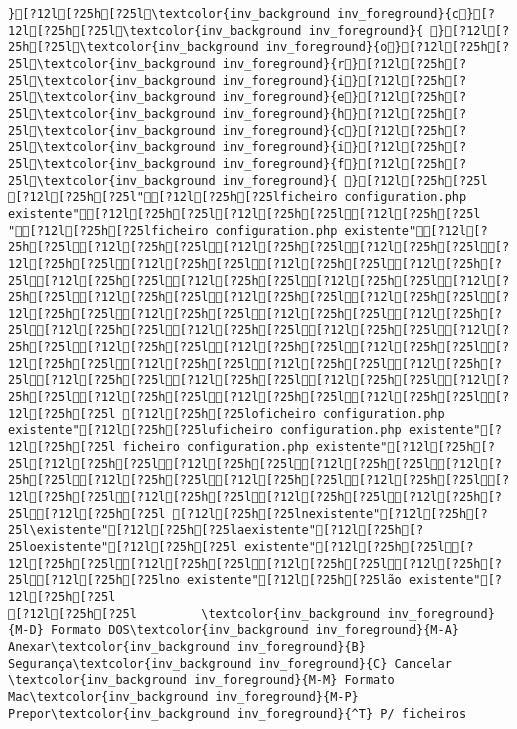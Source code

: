 \documentclass{scrartcl}
\begin{document}
\begin{Verbatim}
}[?12l[?25h[?25l\textcolor{inv_background inv_foreground}{c}[?12l[?25h[?25l\textcolor{inv_background inv_foreground}{ }[?12l[?25h[?25l\textcolor{inv_background inv_foreground}{o}[?12l[?25h[?25l\textcolor{inv_background inv_foreground}{r}[?12l[?25h[?25l\textcolor{inv_background inv_foreground}{i}[?12l[?25h[?25l\textcolor{inv_background inv_foreground}{e}[?12l[?25h[?25l\textcolor{inv_background inv_foreground}{h}[?12l[?25h[?25l\textcolor{inv_background inv_foreground}{c}[?12l[?25h[?25l\textcolor{inv_background inv_foreground}{i}[?12l[?25h[?25l\textcolor{inv_background inv_foreground}{f}[?12l[?25h[?25l\textcolor{inv_background inv_foreground}{ }[?12l[?25h[?25l [?12l[?25h[?25l"[?12l[?25h[?25lficheiro configuration.php existente"[?12l[?25h[?25l[?12l[?25h[?25l[?12l[?25h[?25l "[?12l[?25h[?25lficheiro configuration.php existente"[?12l[?25h[?25l[?12l[?25h[?25l[?12l[?25h[?25l[?12l[?25h[?25l[?12l[?25h[?25l[?12l[?25h[?25l[?12l[?25h[?25l[?12l[?25h[?25l[?12l[?25h[?25l[?12l[?25h[?25l[?12l[?25h[?25l[?12l[?25h[?25l[?12l[?25h[?25l[?12l[?25h[?25l[?12l[?25h[?25l[?12l[?25h[?25l[?12l[?25h[?25l[?12l[?25h[?25l[?12l[?25h[?25l[?12l[?25h[?25l[?12l[?25h[?25l[?12l[?25h[?25l[?12l[?25h[?25l[?12l[?25h[?25l[?12l[?25h[?25l[?12l[?25h[?25l[?12l[?25h[?25l[?12l[?25h[?25l[?12l[?25h[?25l[?12l[?25h[?25l[?12l[?25h[?25l[?12l[?25h[?25l[?12l[?25h[?25l[?12l[?25h[?25l[?12l[?25h[?25l[?12l[?25h[?25l[?12l[?25h[?25l[?12l[?25h[?25l [?12l[?25h[?25loficheiro configuration.php existente"[?12l[?25h[?25luficheiro configuration.php existente"[?12l[?25h[?25l ficheiro configuration.php existente"[?12l[?25h[?25l[?12l[?25h[?25l[?12l[?25h[?25l[?12l[?25h[?25l[?12l[?25h[?25l[?12l[?25h[?25l[?12l[?25h[?25l[?12l[?25h[?25l[?12l[?25h[?25l[?12l[?25h[?25l[?12l[?25h[?25l[?12l[?25h[?25l[?12l[?25h[?25l [?12l[?25h[?25lnexistente"[?12l[?25h[?25l\existente"[?12l[?25h[?25laexistente"[?12l[?25h[?25loexistente"[?12l[?25h[?25l existente"[?12l[?25h[?25l[?12l[?25h[?25l[?12l[?25h[?25l[?12l[?25h[?25l[?12l[?25h[?25l[?12l[?25h[?25lno existente"[?12l[?25h[?25lão existente"[?12l[?25h[?25l
[?12l[?25h[?25l         \textcolor{inv_background inv_foreground}{M-D} Formato DOS\textcolor{inv_background inv_foreground}{M-A} Anexar\textcolor{inv_background inv_foreground}{B} Segurança\textcolor{inv_background inv_foreground}{C} Cancelar           \textcolor{inv_background inv_foreground}{M-M} Formato Mac\textcolor{inv_background inv_foreground}{M-P} Prepor\textcolor{inv_background inv_foreground}{^T} P/ ficheiros

\end{Verbatim}
\end{document}
